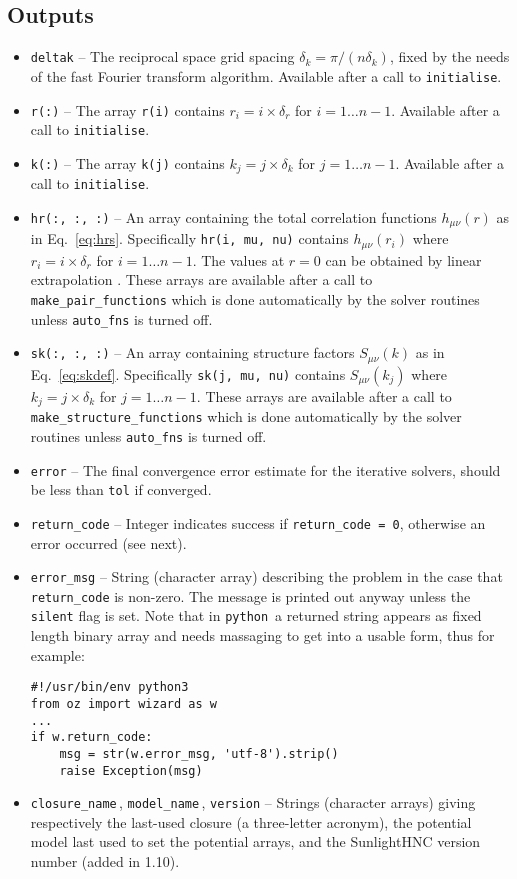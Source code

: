 \documentclass[12pt,a4paper]{article}
\newcommand{\Eqref}[1]{Eq.~\eqref{#1}}
\newcommand{\python}{{\tt python}}
\begin{document}
\subsection{Outputs}
%
\begin{itemize}
%
\item\verb+deltak+ -- The reciprocal space grid spacing
  $\delta_k=\pi/(n\delta_k)$, fixed by the needs of the fast Fourier
  transform algorithm.  Available after a call to \verb+initialise+.
%
\item\verb+r(:)+ -- The array \verb+r(i)+ contains
  $r_i=i\times\delta_r$ for $i=1\dots n-1$.  Available after a call to
  \verb+initialise+.
%
\item\verb+k(:)+ -- The array \verb+k(j)+ contains
  $k_j=j\times\delta_k$ for $j=1\dots n-1$.  Available after a call to
  \verb+initialise+.
%
\item\verb+hr(:, :, :)+ -- An array containing the total correlation
  functions $h_{\mu\nu}(r)$ as in \Eqref{eq:hrs}.  Specifically
  \verb+hr(i, mu, nu)+ contains $h_{\mu\nu}(r_i)$ where
  $r_i=i\times\delta_r$ for $i=1\dots n-1$.  The values at $r=0$ can
  be obtained by linear extrapolation \cite{KMP04}.  These arrays are
  available after a call to \verb+make_pair_functions+ which is done
  automatically by the solver routines unless \verb+auto_fns+ is
  turned off.
%
\item\verb+sk(:, :, :)+ -- An array containing structure factors
  $S_{\mu\nu}(k)$ as in \Eqref{eq:skdef}.  Specifically
  \verb+sk(j, mu, nu)+ contains $S_{\mu\nu}(k_j)$ where
  $k_j=j\times\delta_k$ for $j=1\dots n-1$. These arrays are available
  after a call to \verb+make_structure_functions+ which is done
  automatically by the solver routines unless \verb+auto_fns+ is
  turned off.
%
\item\verb+error+ -- The final convergence error estimate for the
  iterative solvers, should be less than \verb+tol+ if converged.
%
\item\verb+return_code+ -- Integer indicates success if
  \verb+return_code = 0+, otherwise an error occurred (see next).
%
\item\verb+error_msg+ -- String (character array) describing the
  problem in the case that \verb+return_code+ is non-zero.  The
  message is printed out anyway unless the \verb+silent+ flag is set.
  Note that in \python\ a returned string appears as fixed
  length binary array and needs massaging to get into a usable
  form, thus for example:
%
\begin{verbatim}
#!/usr/bin/env python3
from oz import wizard as w
...
if w.return_code: 
    msg = str(w.error_msg, 'utf-8').strip()
    raise Exception(msg)
\end{verbatim}
%
\item\verb+closure_name+\,, \verb+model_name+\,, \verb+version+ --
  Strings (character arrays) giving respectively the last-used closure
  (a three-letter acronym), the potential model last used to set the
  potential arrays, and the SunlightHNC version number (added in
  1.10).
%
\end{itemize}
\end{document}
